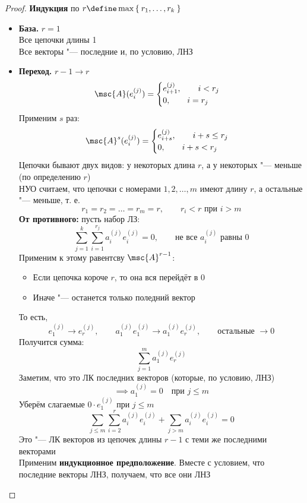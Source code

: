 \begin{proof}
	\textbf{Индукция} по $ r \define \max\set{r_1, \dots, r_k} $
	\begin{itemize}
		\item \textbf{База.} $ r = 1 $ \\
		Все цепочки длины 1 \\
		Все векторы "--- последние и, по условию, ЛНЗ
		\item \textbf{Переход.} $ r - 1 \to r $
		$$ \msc{A}(e_i^{(j)}) =
		\begin{cases}
			e_{i + 1}^{(j)}, \qquad i < r_j \\
			0, \qquad i = r_j
		\end{cases} $$
		Применим $ s $ раз:
		$$ \msc{A}^s(e_i^{(j)}) =
		\begin{cases}
			e_{i + s}^{(j)}, \qquad i + s \le r_j \\
			0, \qquad i + s < r_j
		\end{cases} $$
		Цепочки бывают двух видов: у некоторых длина $ r $, а у некоторых "--- меньше (по определению $ r $) \\
		НУО считаем, что цепочки с номерами $ 1, 2, \dots, m $ имеют длину $ r $, а остальные "--- меньше, т. е.
		$$ r_1 = r_2 = \dots = r_m = r, \qquad r_i < r \text{ при } i > m $$
		\textbf{От противного:} пусть набор ЛЗ:
		$$ \sum_{j = 1}^k \sum_{i = 1}^{r_j} a_i^{(j)}e_i^{(j)} = 0, \qquad \text{не все } a_i^{(j)} \text{ равны } 0 $$
		Применим к этому равентсву $ \msc{A}^{r- 1} $:
		\begin{itemize}
			\item Если цепочка короче $ r $, то она вся перейдёт в 0
			\item Иначе "--- останется только поледний вектор
		\end{itemize}
		То есть,
		$$ e_1^{(j)} \to e_r^{(j)}, \qquad a_1^{(j)}e_1^{(j)} \to a_1^{(j)}e_r^{(j)}, \qquad \text{остальные } \to 0 $$
		Получится сумма:
		$$ \sum_{j = 1}^m a_1^{(j)} e_r^{(j)} $$
		Заметим, что это ЛК последних векторов (которые, по условию, ЛНЗ)
		$$ \implies a_1^{(j)} = 0 \quad \text{при } j \le m $$
		Уберём слагаемые $ 0 \cdot e_1^{(j)} $ при $ j \le m $
		$$ \sum_{j \le m} \sum_{i = 2}^r a_i^{(j)} e_i^{(j)} + \sum_{j > m}a_i^{(j)}e_i^{(j)} = 0 $$
		Это "--- ЛК векторов из цепочек длины $ r - 1 $ с теми же последними векторами \\
		Применим \textbf{индукционное предположение}. Вместе с условием, что последние векторы ЛНЗ, получаем, что все они ЛНЗ
	\end{itemize}
\end{proof}

